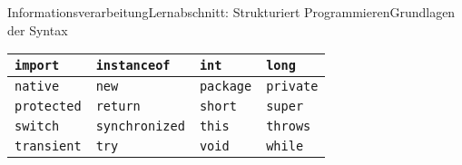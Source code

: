 \documentclass[11pt,oneside,openany,headings=optiontotoc,11pt,numbers=noenddot]{article}
\begin{document}
\begin{worksheet}{Informationsverarbeitung}{Lernabschnitt: Strukturiert Programmieren}{Grundlagen der Syntax}
\begin{tabularx}{\textwidth}{|X|X|X|X|}
			\hline
			{\lstinline[style=JavaInputStyle]{import}} & {\lstinline[style=JavaInputStyle]{instanceof}} & {\lstinline[style=JavaInputStyle]{int}} & {\lstinline[style=JavaInputStyle]{long}}\\
			\hline
			{\lstinline[style=JavaInputStyle]{native}} & {\lstinline[style=JavaInputStyle]{new}} & {\lstinline[style=JavaInputStyle]{package}} & {\lstinline[style=JavaInputStyle]{private}}\\
			\hline
			{\lstinline[style=JavaInputStyle]{protected}} & {\lstinline[style=JavaInputStyle]{return}} & {\lstinline[style=JavaInputStyle]{short}} & {\lstinline[style=JavaInputStyle]{super}}\\
			\hline
			{\lstinline[style=JavaInputStyle]{switch}} & {\lstinline[style=JavaInputStyle]{synchronized}} & {\lstinline[style=JavaInputStyle]{this}} & {\lstinline[style=JavaInputStyle]{throws}}\\
			\hline
			{\lstinline[style=JavaInputStyle]{transient}} & {\lstinline[style=JavaInputStyle]{try}} & {\lstinline[style=JavaInputStyle]{void}} & {\lstinline[style=JavaInputStyle]{while}}\\
			\hline
		\end{tabularx}
		
		

\end{worksheet}
\end{document}
